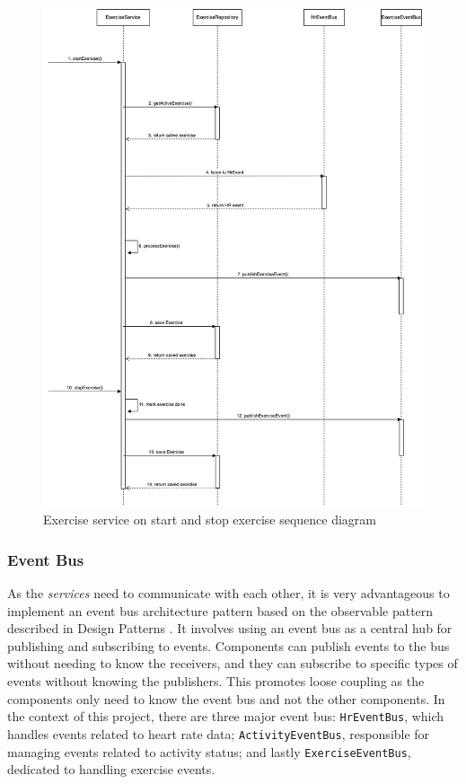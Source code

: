\begin{figure}[H]
    \centering
    \includegraphics[width=1\textwidth]{diagrams/exercise-service-start.drawio.png}
    \caption{Exercise service on start and stop exercise sequence diagram}
    \label{fig:start_exercise_diagram}
\end{figure}

\subsubsection{Event Bus}
As the \emph{services} need to communicate with each other, it is very advantageous to implement an event bus architecture pattern based on the observable pattern described in Design Patterns \autocite{gamma1995design}. 
It involves using an event bus as a central hub for publishing and subscribing to events. Components can publish events to the bus without needing to know the receivers, and they can subscribe to specific types of events without knowing the publishers.
This promotes loose coupling as the components only need to know the event bus and not the other components.
In the context of this project, there are three major event bus: \texttt{HrEventBus}, which handles events related to heart rate data; \texttt{ActivityEventBus}, responsible for managing events related to activity status; and lastly \texttt{ExerciseEventBus}, dedicated to handling exercise events.

